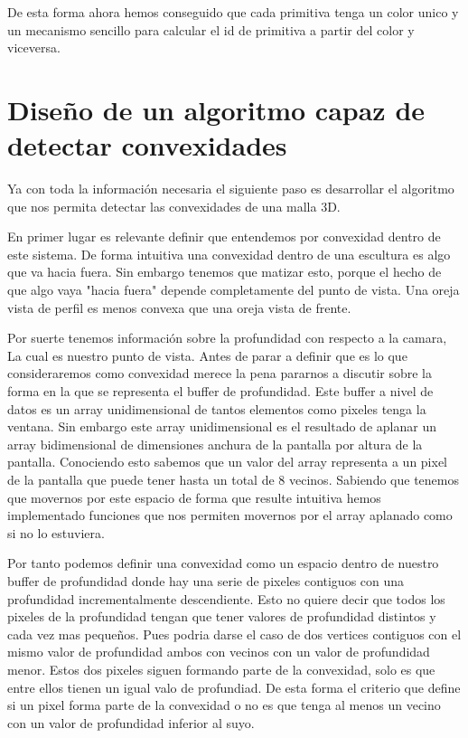 De esta forma ahora hemos conseguido que cada primitiva tenga un color unico y un mecanismo sencillo para calcular el id de primitiva a partir del color y viceversa.
\section{Diseño de un algoritmo capaz de detectar convexidades}

Ya con toda la información necesaria el siguiente paso es desarrollar el algoritmo que nos permita detectar las convexidades de una malla 3D.

En primer lugar es relevante definir que entendemos por convexidad dentro de este sistema. De forma intuitiva una convexidad dentro de una escultura es algo que va hacia fuera. Sin embargo tenemos que matizar esto, porque el hecho de que algo vaya "hacia fuera" depende completamente del punto de vista. Una oreja vista de perfil es menos convexa que una oreja vista de frente.

Por suerte tenemos información sobre la profundidad con respecto a la camara, La cual es nuestro punto de vista. Antes de parar a definir que es lo que consideraremos como convexidad merece la pena pararnos a discutir sobre la forma en la que se representa el buffer de profundidad. Este buffer a nivel de datos es un array unidimensional de tantos elementos como pixeles tenga la ventana. Sin embargo este array unidimensional es el resultado de aplanar un array bidimensional de dimensiones anchura de la pantalla por altura de la pantalla. Conociendo esto sabemos que un valor del array representa a un pixel de la pantalla que puede tener hasta un total de 8 vecinos. Sabiendo que tenemos que movernos por este espacio de forma que resulte intuitiva hemos implementado
funciones que nos permiten movernos por el array aplanado como si no lo estuviera. 

Por tanto podemos definir una convexidad como un espacio dentro de nuestro buffer de profundidad donde hay una serie de pixeles contiguos con una profundidad incrementalmente descendiente. Esto no quiere decir que todos los pixeles de la profundidad tengan que tener valores de profundidad distintos y cada vez mas pequeños. Pues podria darse el caso de dos vertices contiguos con el mismo valor de profundidad ambos con vecinos con un valor de profundidad menor. Estos dos pixeles siguen formando parte de la convexidad, solo es que entre ellos tienen un igual valo de profundiad. De esta forma el criterio que define si un pixel forma parte de la convexidad o no es que tenga al menos un vecino con un valor de profundidad inferior al suyo.

